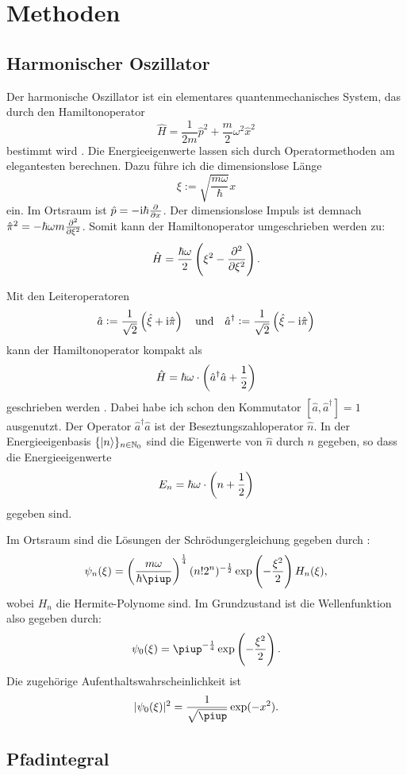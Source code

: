 
\chapter{Methoden}

\section{Harmonischer Oszillator}

Der harmonische Oszillator ist ein elementares quantenmechanisches System, das
durch den Hamiltonoperator
\[
    \hat H = \frac{1}{2m} \hat p^2 + \frac{m}{2} \omega^2 \hat x^2
\]
bestimmt wird \parencite[(3.1)]{Schwabl/Quantenmechanik}. Die Energieeigenwerte
lassen sich durch Operatormethoden am elegantesten berechnen. Dazu führe ich
die dimensionslose Länge
\[
    \xi := \sqrt{\frac{m\omega}{\hbar}} x
\]
ein. Im Ortsraum ist $\hat p = - \iup \hbar \pd{}x$. Der dimensionslose Impuls
ist demnach $\hat \pi^2 = - \hbar\omega m \pd[2]{}\xi$. Somit kann der
Hamiltonoperator umgeschrieben werden zu:
\[
    \hat H = \frac{\hbar\omega}2 \del{\xi^2 - \dpd[2]{}\xi}.
\]

Mit den Leiteroperatoren
\[
    \hat a := \frac1{\sqrt2} \del{\hat \xi + \iup \hat \pi}
    \quad\text{und}\quad
    \hat a^\dagger := \frac1{\sqrt2} \del{\hat \xi - \iup \hat \pi}
\]
kann der Hamiltonoperator kompakt als
\[
    \hat H = \hbar\omega \cdot \del{\hat a^\dagger \hat a + \frac12}
\]
geschrieben werden \parencite[(3.8)]{Schwabl/Quantenmechanik}. Dabei habe ich
schon den Kommutator $[\hat a, \hat a^\dagger] = 1$ ausgenutzt. Der Operator
$\hat a^\dagger \hat a$ ist der Beseztungszahloperator $\hat n$. In der
Energieeigenbasis $\{ \ket n \}_{n \in \mathbb N_0}$ sind die Eigenwerte von $\hat n$
durch $n$ gegeben, so dass die Energieeigenwerte
\[
    E_n = \hbar\omega \cdot \del{n + \frac 12}
\]
gegeben sind.

Im Ortsraum sind die Lösungen der Schrödungergleichung gegeben durch
\parencite[(4.159)]{nolting-theo5}:
\[
    \psi_n(\xi) = \del{\frac{m\omega}{\hbar\piup}}^{\frac14} (n! 2^n)^{-\frac12}
    \exp\del{- \frac{\xi^2}2} H_n(\xi),
\]
wobei $H_n$ die Hermite-Polynome sind. Im Grundzustand ist die Wellenfunktion
also gegeben durch:
\[
    \psi_0(\xi) = \piup^{-\frac14} \exp\del{-
    \frac{\xi^2}2}.
\]
Die zugehörige Aufenthaltswahrscheinlichkeit ist
\[
    |\psi_0(\xi)|^2 = \frac1{\sqrt\piup} \exp(-x^2).
\]

\section{Pfadintegral}


